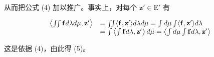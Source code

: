 从而把公式 (4) 加以推广。事实上，对每个 \(\mathbf{z}' \in \mathrm{E}'\) 有

\[
\begin{array}{r l} \left\langle \iint \mathbf {f} d \lambda d \mu , \mathbf {z} ^ {\prime} \right\rangle & = \iint \langle \mathbf {f}, \mathbf {z} ^ {\prime} \rangle d \lambda d \mu = \int d \mu \int \langle \mathbf {f}, \mathbf {z} ^ {\prime} \rangle d \lambda \\ & = \int \left\langle \int \mathbf {f} d \lambda , \mathbf {z} ^ {\prime} \right\rangle d \mu = \left\langle \int d \mu \int \mathbf {f} d \lambda , \mathbf {z} ^ {\prime} \right\rangle \end{array}
\]

这是依据 (4)，由此得 (5)。

